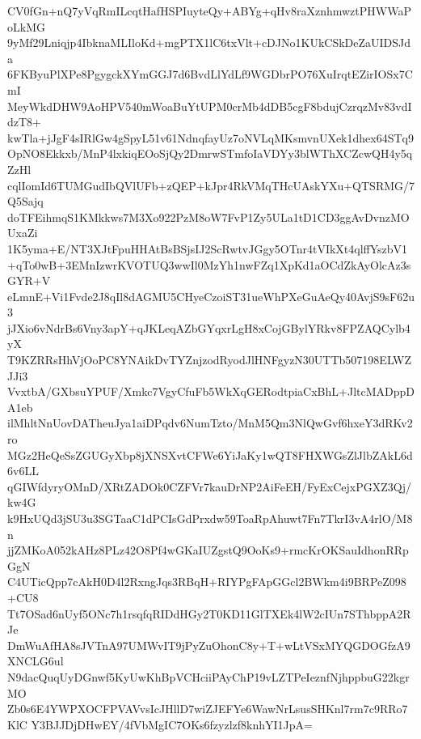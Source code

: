 CV0fGn+nQ7yVqRmILcqtHafHSPIuyteQy+ABYg+qHv8raXznhmwztPHWWaPoLkMG
9yMf29Lniqjp4IbknaMLIloKd+mgPTX1lC6txVlt+cDJNo1KUkCSkDeZaUIDSJda
6FKByuPlXPe8PgygckXYmGGJ7d6BvdLlYdLf9WGDbrPO76XuIrqtEZirIOSx7CmI
MeyWkdDHW9AoHPV540mWoaBuYtUPM0crMb4dDB5cgF8bdujCzrqzMv83vdIdzT8+
kwTla+jJgF4sIRlGw4gSpyL51v61NdnqfayUz7oNVLqMKsmvnUXek1dhex64STq9
OpNO8Ekkxb/MnP4lxkiqEOoSjQy2DmrwSTmfoIaVDYy3blWThXCZcwQH4y5qZzHl
cqlIomId6TUMGudIbQVlUFb+zQEP+kJpr4RkVMqTHcUAskYXu+QTSRMG/7Q5Sajq
doTFEihmqS1KMkkws7M3Xo922PzM8oW7FvP1Zy5ULa1tD1CD3ggAvDvnzMOUxaZi
1K5yma+E/NT3XJtFpuHHAtBsBSjsIJ2ScRwtvJGgy5OTnr4tVIkXt4qlffYszbV1
+qTo0wB+3EMnIzwrKVOTUQ3wwIl0MzYh1nwFZq1XpKd1aOCdZkAyOlcAz3sGYR+V
eLmnE+Vi1Fvde2J8qIl8dAGMU5CHyeCzoiST31ueWhPXeGuAeQy40AvjS9sF62u3
jJXio6vNdrBs6Vny3apY+qJKLeqAZbGYqxrLgH8xCojGBylYRkv8FPZAQCylb4yX
T9KZRRsHhVjOoPC8YNAikDvTYZnjzodRyodJlHNFgyzN30UTTb507198ELWZJJi3
VvxtbA/GXbsuYPUF/Xmkc7VgyCfuFb5WkXqGERodtpiaCxBhL+JltcMADppDA1eb
ilMhltNnUovDATheuJya1aiDPqdv6NumTzto/MnM5Qm3NlQwGvf6hxeY3dRKv2ro
MGz2HeQeSsZGUGyXbp8jXNSXvtCFWe6YiJaKy1wQT8FHXWGsZlJlbZAkL6d6v6LL
qGIWfdyryOMnD/XRtZADOk0CZFVr7kauDrNP2AiFeEH/FyExCejxPGXZ3Qj/kw4G
k9HxUQd3jSU3u3SGTaaC1dPCIsGdPrxdw59ToaRpAhuwt7Fn7TkrI3vA4rlO/M8n
jjZMKoA052kAHz8PLz42O8Pf4wGKaIUZgstQ9OoKs9+rmcKrOKSauIdhonRRpGgN
C4UTicQpp7cAkH0D4l2RxngJqs3RBqH+RIYPgFApGGcl2BWkm4i9BRPeZ098+CU8
Tt7OSad6nUyf5ONc7h1rsqfqRIDdHGy2T0KD11GlTXEk4lW2cIUn7SThbppA2RJe
DmWuAfHA8sJVTnA97UMWvIT9jPyZuOhonC8y+T+wLtVSxMYQGDOGfzA9XNCLG6ul
N9dacQuqUyDGnwf5KyUwKhBpVCHciiPAyChP19vLZTPeIeznfNjhppbuG22kgrMO
Zb0s6E4YWPXOCFPVAVvsIcJHllD7wiZJEFYe6WawNrLsusSHKnl7rm7c9RRo7KlC
Y3BJJDjDHwEY/4fVbMgIC7OKs6fzyzlzf8knhYI1JpA=
